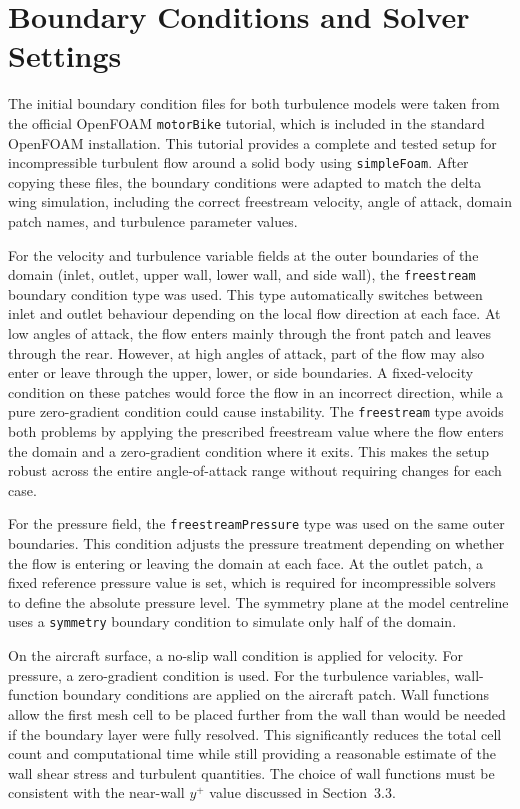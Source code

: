 \section{Boundary Conditions and Solver Settings}
The initial boundary condition files for both turbulence models were taken from the official OpenFOAM \texttt{motorBike} tutorial, which is included in the standard OpenFOAM installation. This tutorial provides a complete and tested setup for incompressible turbulent flow around a solid body using \texttt{simpleFoam}. After copying these files, the boundary conditions were adapted to match the delta wing simulation, including the correct freestream velocity, angle of attack, domain patch names, and turbulence parameter values.

For the velocity and turbulence variable fields at the outer boundaries of the domain (inlet, outlet, upper wall, lower wall, and side wall), the \texttt{freestream} boundary condition type was used. This type automatically switches between inlet and outlet behaviour depending on the local flow direction at each face. At low angles of attack, the flow enters mainly through the front patch and leaves through the rear. However, at high angles of attack, part of the flow may also enter or leave through the upper, lower, or side boundaries. A fixed-velocity condition on these patches would force the flow in an incorrect direction, while a pure zero-gradient condition could cause instability. The \texttt{freestream} type avoids both problems by applying the prescribed freestream value where the flow enters the domain and a zero-gradient condition where it exits. This makes the setup robust across the entire angle-of-attack range without requiring changes for each case.

For the pressure field, the \texttt{freestreamPressure} type was used on the same outer boundaries. This condition adjusts the pressure treatment depending on whether the flow is entering or leaving the domain at each face. At the outlet patch, a fixed reference pressure value is set, which is required for incompressible solvers to define the absolute pressure level. The symmetry plane at the model centreline uses a \texttt{symmetry} boundary condition to simulate only half of the domain.

On the aircraft surface, a no-slip wall condition is applied for velocity. For pressure, a zero-gradient condition is used. For the turbulence variables, wall-function boundary conditions are applied on the aircraft patch. Wall functions allow the first mesh cell to be placed further from the wall than would be needed if the boundary layer were fully resolved. This significantly reduces the total cell count and computational time while still providing a reasonable estimate of the wall shear stress and turbulent quantities. The choice of wall functions must be consistent with the near-wall $y^{+}$ value discussed in Section~3.3.

